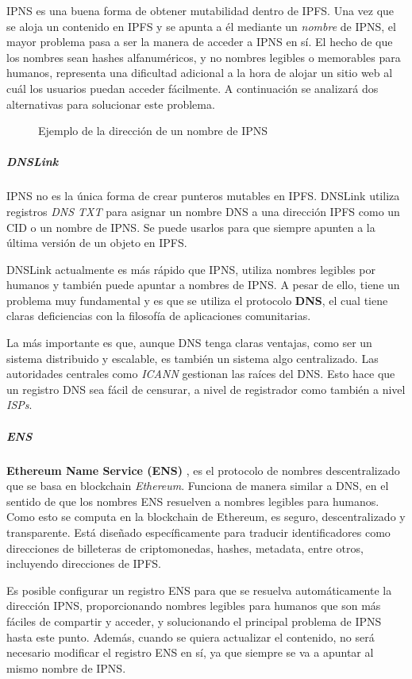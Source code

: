 IPNS es una buena forma de obtener mutabilidad dentro de IPFS. Una vez que se aloja un contenido en IPFS y se apunta a él mediante un \textit{nombre} de IPNS, el mayor problema pasa a ser la manera de acceder a IPNS en sí. El hecho de que los nombres sean hashes alfanuméricos, y no nombres legibles o memorables para humanos, representa una dificultad adicional a la hora de alojar un sitio web al cuál los usuarios puedan acceder fácilmente. A continuación se analizará dos alternativas para solucionar este problema.

\begin{figure}[h]
\centering
{}
\caption{Ejemplo de la dirección de un nombre de IPNS}
\end{figure}

\subparagraph{DNSLink}

IPNS no es la única forma de crear punteros mutables en IPFS. DNSLink \cite{dnslink} utiliza registros \textit{DNS TXT} para asignar un nombre DNS a una dirección IPFS como un CID o un nombre de IPNS. Se puede usarlos para que siempre apunten a la última versión de un objeto en IPFS.

DNSLink actualmente es más rápido que IPNS, utiliza nombres legibles por humanos y también puede apuntar a nombres de IPNS. A pesar de ello, tiene un problema muy fundamental y es que se utiliza el protocolo \textbf{DNS}, el cual tiene claras deficiencias con la filosofía de aplicaciones comunitarias.

La más importante es que, aunque DNS tenga claras ventajas, como ser un sistema distribuido y escalable, es también un sistema algo centralizado. Las autoridades centrales como \textit{ICANN} gestionan las raíces del DNS. Esto hace que un registro DNS sea fácil de censurar, a nivel de registrador como también a nivel \textit{ISPs}.

\subparagraph{ENS}

\textbf{Ethereum Name Service (ENS)} \cite{ens}, es el protocolo de nombres descentralizado que se basa en blockchain \textit{Ethereum}. Funciona de manera similar a DNS, en el sentido de que los nombres ENS resuelven a nombres legibles para humanos. Como esto se computa en la blockchain de Ethereum, es seguro, descentralizado y transparente. Está diseñado específicamente para traducir identificadores como direcciones de billeteras de criptomonedas, hashes, metadata, entre otros, incluyendo direcciones de IPFS.

Es posible configurar un registro ENS para que se resuelva automáticamente la dirección IPNS, proporcionando nombres legibles para humanos que son más fáciles de compartir y acceder, y solucionando el principal problema de IPNS hasta este punto. Además, cuando se quiera actualizar el contenido, no será necesario modificar el registro ENS en sí, ya que siempre se va a apuntar al mismo nombre de IPNS.

